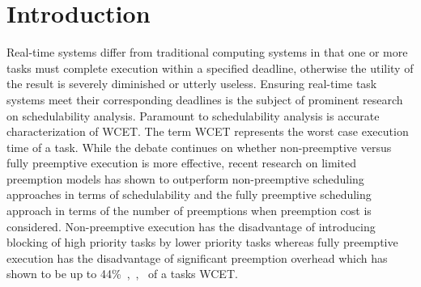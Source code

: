 \vspace{-10pt}
\section{Introduction}\label{sec:introduction}

Real-time systems differ from traditional computing systems in that one or more tasks must complete execution within a specified deadline, otherwise the utility of the result is severely diminished or utterly useless.  Ensuring real-time task systems meet their corresponding deadlines is the subject of prominent research on schedulability analysis.  Paramount to schedulability analysis is accurate characterization of WCET.  The term WCET represents the worst case execution time of a task.  While the debate continues on whether non-preemptive versus fully preemptive execution is more effective, recent research on limited preemption models has shown to outperform non-preemptive scheduling approaches in terms of schedulability and the fully preemptive scheduling approach in terms of the number of preemptions when preemption cost is considered.  Non-preemptive execution has the disadvantage of introducing blocking of high priority tasks by lower priority tasks whereas fully preemptive execution has the disadvantage of significant preemption overhead which has shown to be up to 44\%~\cite{pellizzoni:07},~\cite{pellizzoni:08},~\cite{pellizzoni:11} of a tasks WCET.

